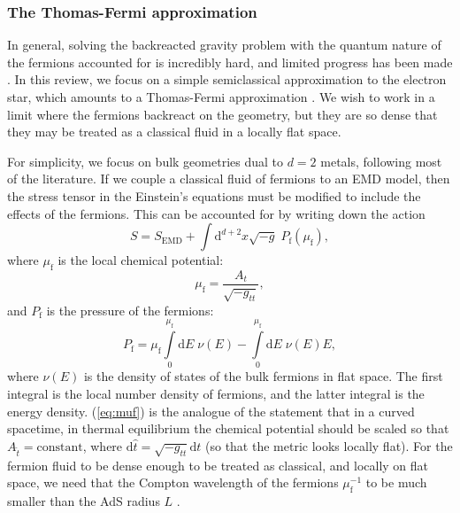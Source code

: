 \documentclass[10pt, oneside]{book}
\begin{document}
\begin{doublespace}
\subsubsection{The Thomas-Fermi approximation} \label{sec:thomasfermi}
In general, solving the backreacted gravity problem with the quantum nature of the fermions accounted for is incredibly hard, and limited progress has been made \cite{Allais:2012ye, Allais:2013lha}.   In this review, we focus on a simple semiclassical approximation to the electron star, which amounts to a Thomas-Fermi approximation \cite{Hartnoll:2010gu}.   We wish to work in a limit where the fermions backreact on the geometry,  but they are so dense that they may be treated as a classical fluid in a locally flat space.

For simplicity, we focus on bulk geometries dual to $d=2$ metals, following most of the literature.      If we couple a classical fluid of fermions to an EMD model, then the stress tensor in the Einstein's equations must be modified to include the effects of the fermions.   This can be accounted for by writing down the action \cite{Hartnoll:2011pp} \begin{equation}
S = S_{\mathrm{EMD}} + \int \mathrm{d}^{d+2}x \sqrt{-g} \; P_{\mathrm{f}}(\mu_{\mathrm{f}}),
\end{equation}
where $\mu_{\mathrm{f}}$ is the local chemical potential:  \begin{equation}
\mu_{\mathrm{f}} = \frac{A_t}{\sqrt{-g_{tt}}},  \label{eq:muf}
\end{equation}
and $P_{\mathrm{f}}$ is the pressure of the fermions:  \begin{equation}
P_{\mathrm{f}} = \mu_{\mathrm{f}}\int\limits_0^{\mu_{\mathrm{f}}} \mathrm{d}E \; \nu(E) - \int\limits_0^{\mu_{\mathrm{f}}} \mathrm{d}E \; \nu(E)E,
\end{equation}
where $\nu(E)$ is the density of states of the bulk fermions in flat space.  The first integral is the local number density of fermions, and the latter integral is the energy density.   (\ref{eq:muf}) is the analogue of the statement that in a curved spacetime, in thermal equilibrium the chemical potential should be scaled so that $A_{\hat t} = \text{constant}$, where $\mathrm{d}\hat t = \sqrt{-g_{tt}}\mathrm{d}t$ (so that the metric looks locally flat).    For the fermion fluid to be dense enough to be treated as classical, and locally on flat space,  we need that the Compton wavelength of the fermions $\mu_{\mathrm{f}}^{-1}$ to be much smaller than the AdS radius $L$ \cite{Hartnoll:2010gu}.


\end{doublespace}
\end{document}
